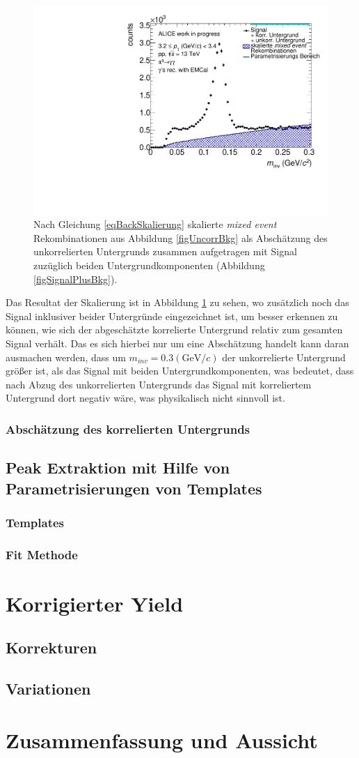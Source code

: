 \documentclass[]{article}
\begin{document}
	\begin{figure}[tbp]
		\centering
		\includegraphics[width=.7\linewidth]{hUncorrBkgNorm.pdf}
		\caption{Nach Gleichung \ref{eqBackSkalierung} skalierte {\it mixed event} Rekombinationen aus Abbildung \ref{figUncorrBkg} als Absch{\"a}tzung des unkorrelierten Untergrunds zusammen aufgetragen mit Signal zuz{\"u}glich beiden Untergrundkomponenten (Abbildung \ref{figSignalPlusBkg}).}
		\label{figUncorrBkgNorm}
	\end{figure}
	Das Resultat der Skalierung ist in Abbildung \ref{figUncorrBkgNorm} zu sehen, wo zus{\"a}tzlich noch das Signal inklusiver beider Untergr{\"u}nde eingezeichnet ist, um besser erkennen zu k{\"o}nnen, wie sich der abgesch{\"a}tzte korrelierte Untergrund relativ zum gesamten Signal verh{\"a}lt.
	Das es sich hierbei nur um eine Absch{\"a}tzung handelt kann daran ausmachen werden, dass um $m_{inv} = 0.3 (\text{GeV/}c)$ der unkorrelierte Untergrund gr{\"o}{\ss}er ist, als das Signal mit beiden Untergrundkomponenten, was bedeutet, dass nach Abzug des unkorrelierten Untergrunds das Signal mit korreliertem Untergrund dort negativ w{\"a}re, was physikalisch nicht sinnvoll ist.
	\subsubsection{Absch{\"a}tzung des korrelierten Untergrunds}
	\subsection{Peak Extraktion mit Hilfe von Parametrisierungen von Templates}
	\subsubsection{Templates}
	\subsubsection{Fit Methode}
	\section{Korrigierter Yield}
	\subsection{Korrekturen}
	\subsection{Variationen}
	\section{Zusammenfassung und Aussicht}
\end{document}
